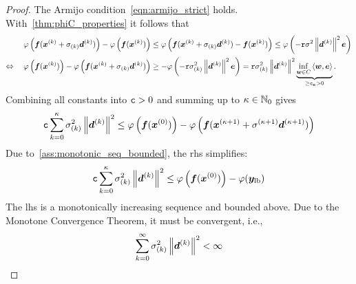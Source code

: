 \documentclass{article}
\theoremstyle{plain}
\theoremstyle{definition}
\begin{document}
\begin{proof}
	The Armijo condition~\eqref{eqn:armijo_strict} holds.
	With~\cref{thm:phiC_properties} it follows that 
	\begin{align*}
	\varphi\left(
		\bm{f}(\bm{x}^{(k)} + \sigma_{(k)} \bm{d}^{(k)})
	\right)
	-
	\varphi\left(
		\bm{f}(\bm{x}^{(k)})
	\right)
	&\le
	\varphi\left(
		\bm{f}(\bm{x}^{(k)} + \sigma_{(k)} \bm{d}^{(k)})
		-
		\bm{f}(\bm{x}^{(k)})
	\right)
	\le
	\varphi\left(
	- \mathtt{r} \sigma^2 \left\|\bm{d}^{(k)}\right\|^2 \bm{e}
	\right)
	\\
	\Leftrightarrow\quad
	\varphi\left(
		\bm{f}(\bm{x}^{(k)})
	\right)
	-
	\varphi\left(
		\bm{f}(\bm{x}^{(k)} + \sigma_{(k)} \bm{d}^{(k)})
	\right)
	&\ge 
	-
	\varphi\left(
	- \mathtt{r} \sigma_{(k)}^2 \left\|\bm{d}^{(k)}\right\|^2 \bm{e}
	\right)
	=
	\mathtt{r} \sigma_{(k)}^2 \left\|\bm{d}^{(k)}\right\|^2 
	\underbrace{
		\inf_{\bm{w}\in C} \left\langle \bm{w}, \bm{e} \right\rangle
	}_{\geq \mathtt{c}_{\bm{e}} > 0}
	.
	\end{align*}
	Combining all constants into $\mathtt c >0$ and summing up to $\kappa \in \mathbb N_0$ gives 
	$$
	\mathtt c
	\sum_{k=0}^\kappa
	\sigma_{(k)}^2 \left\|\bm{d}^{(k)}\right\|^2
	\leq
	\varphi\left(
		\bm{f}(\bm{x}^{(0)})
	\right)
	-
	\varphi\left(
		\bm{f}(\bm{x}^{(\kappa + 1)} + \sigma^{(\kappa + 1)} \bm{d}^{(\kappa + 1)})
	\right)
	$$
	Due to~\cref{ass:monotonic_seq_bounded},
	the \ac{rhs} simplifies:
	$$
	\mathtt c
	\sum_{k=0}^\kappa
	\sigma_{(k)}^2 \left\|\bm{d}^{(k)}\right\|^2
	\leq
	\varphi\left(
		\bm{f}(\bm{x}^{(0)})
	\right)
	-
	\varphi(\bm{y}_{\mathrm{lb}})
	$$
	The \ac{lhs} is a monotonically increasing sequence and bounded above.
	Due to the Monotone Convergence Theorem, it must be convergent, i.e.,
	$$\sum_{k=0}^\infty \sigma_{(k)}^2 \left\|\bm{d}^{(k)}\right\|^2 < \infty $$
\end{proof}
\end{document}
